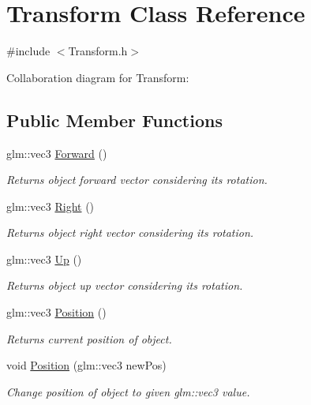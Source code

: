 \hypertarget{class_transform}{}\section{Transform Class Reference}
\label{class_transform}


{\ttfamily \#include $<$Transform.\+h$>$}



Collaboration diagram for Transform\+:
\subsection*{Public Member Functions}
\begin{DoxyCompactItemize}
\item 
glm\+::vec3 \mbox{\hyperlink{class_transform_a5486927ebcb043b7347644041024f47c}{Forward}} ()
\begin{DoxyCompactList}\small\item\em Returns object forward vector considering it\textquotesingle{}s rotation. \end{DoxyCompactList}\item 
glm\+::vec3 \mbox{\hyperlink{class_transform_ad8a1ed0e1024d93a8722e6d1b8e886c8}{Right}} ()
\begin{DoxyCompactList}\small\item\em Returns object right vector considering it\textquotesingle{}s rotation. \end{DoxyCompactList}\item 
glm\+::vec3 \mbox{\hyperlink{class_transform_a647f01f73a5ad2d729080649bc477b76}{Up}} ()
\begin{DoxyCompactList}\small\item\em Returns object up vector considering it\textquotesingle{}s rotation. \end{DoxyCompactList}\item 
glm\+::vec3 \mbox{\hyperlink{class_transform_ab3aa7217c2b53146ae0ec4a4eddf3ba0}{Position}} ()
\begin{DoxyCompactList}\small\item\em Returns current position of object. \end{DoxyCompactList}\item 
void \mbox{\hyperlink{class_transform_a1f5f28293a7e54f8330f4090ea38b9f7}{Position}} (glm\+::vec3 new\+Pos)
\begin{DoxyCompactList}\small\item\em Change position of object to given glm\+::vec3 value. \end{DoxyCompactList}\item 

\end{DoxyCompactItemize}
